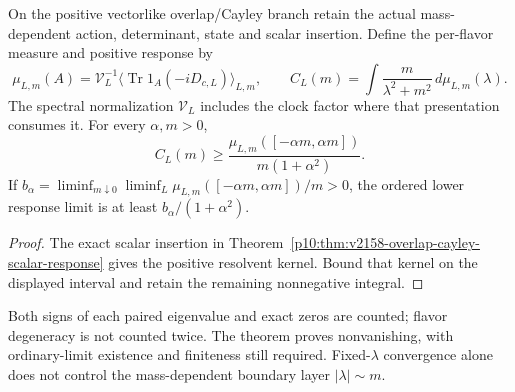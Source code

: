 \documentclass[12pt,a4paper]{article}
\begin{document}
\begin{theorem}
\label{p10:thm:weighted-chiral-mode-window}
On the positive vectorlike overlap/Cayley branch retain the actual
mass-dependent action, determinant, state and scalar insertion. Define
the per-flavor measure and positive response by
\[
 \mu_{L,m}(A)=\mathcal V_L^{-1}
       \langle\operatorname{Tr}1_A(-iD_{c,L})\rangle_{L,m},\qquad
 C_L(m)=\int\frac{m}{\lambda^2+m^2}\,d\mu_{L,m}(\lambda).
\]
The spectral normalization $\mathcal V_L$ includes the clock factor
where that presentation consumes it. For every $\alpha,m>0$,
\[
 \boxed{C_L(m)\ge
 \frac{\mu_{L,m}([-\alpha m,\alpha m])}{m(1+\alpha^2)}.}
\]
If $b_\alpha=\liminf_{m\downarrow0}\liminf_L
\mu_{L,m}([-\alpha m,\alpha m])/m>0$, the ordered lower response
limit is at least $b_\alpha/(1+\alpha^2)$.
\end{theorem}
\begin{proof}
The exact scalar insertion in
Theorem~\ref{p10:thm:v2158-overlap-cayley-scalar-response}
gives the positive resolvent kernel. Bound that kernel on the
displayed interval and retain the remaining nonnegative integral.
\end{proof}
Both signs of each paired eigenvalue and exact zeros are counted;
flavor degeneracy is not counted twice. The theorem proves
nonvanishing, with ordinary-limit existence and finiteness still required.
Fixed-$\lambda$ convergence alone does not control the mass-dependent
boundary layer $|\lambda|\sim m$.
\end{document}
